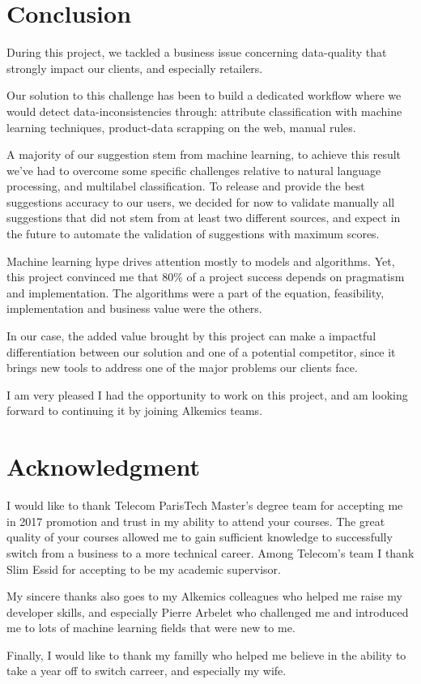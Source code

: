 \chapter*{Conclusion} %
\label{cha:conclusion}


During this project, we tackled a business issue concerning data-quality that strongly impact our clients, and especially retailers.

Our solution to this challenge has been to build a dedicated workflow where we would detect data-inconsistencies through: attribute classification with machine learning techniques, product-data scrapping on the web, manual rules.

A majority of our suggestion stem from machine learning, to achieve this result we've had to overcome some specific challenges relative to natural language processing, and multilabel classification. To release and provide the best suggestions accuracy to our users, we decided for now to validate manually all suggestions that did not stem from at least two different sources, and expect in the future to automate the validation of suggestions with maximum scores.

Machine learning hype drives attention mostly to models and algorithms.  Yet, this project convinced me that 80\% of a project success depends on pragmatism and implementation. The algorithms were a part of the equation, feasibility, implementation and business value were the others.

In our case, the added value brought by this project can make a impactful differentiation between our solution and one of a potential competitor, since it brings new tools to address one of the major problems our clients face.

I am very pleased I had the opportunity to work on this project, and am looking forward to continuing it by joining Alkemics teams.

\chapter*{Acknowledgment}

I would like to thank Telecom ParisTech Master's degree team for accepting me in 2017 promotion and trust in my ability to attend your courses. The great quality of your courses allowed me to gain sufficient knowledge to successfully switch from a business to a more technical career. Among Telecom's team I thank Slim Essid for accepting to be my academic supervisor.

My sincere thanks also goes to my Alkemics colleagues who helped me raise my developer skills, and especially Pierre Arbelet who challenged me and introduced me to lots of machine learning fields that were new to me.

Finally, I would like to thank my familly who helped me believe in the ability to take a year off to switch carreer, and especially my wife.

